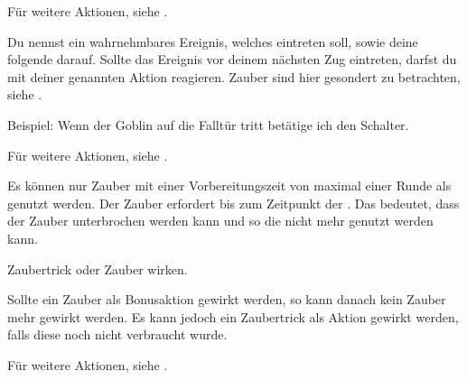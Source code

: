 Für weitere Aktionen, siehe .



Du nennst ein wahrnehmbares Ereignis, welches eintreten soll, sowie deine folgende  darauf. Sollte das Ereignis vor deinem nächsten Zug eintreten, darfst du mit deiner genannten Aktion reagieren. Zauber sind hier gesondert zu betrachten, siehe .

Beispiel: Wenn der Goblin auf die Falltür tritt betätige ich den Schalter.

Für weitere Aktionen, siehe .



Es können nur Zauber mit einer Vorbereitungszeit von maximal einer Runde als  genutzt werden. Der Zauber erfordert bis zum Zeitpunkt der  . Das bedeutet, dass der Zauber unterbrochen werden kann und so die  nicht mehr genutzt werden kann.



Zaubertrick oder Zauber wirken.

Sollte ein Zauber als Bonusaktion gewirkt werden, so kann danach kein Zauber mehr gewirkt werden. Es kann jedoch ein Zaubertrick als Aktion gewirkt werden, falls diese noch nicht verbraucht wurde.

Für weitere Aktionen, siehe .